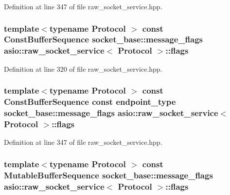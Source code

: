 Definition at line 347 of file raw\+\_\+socket\+\_\+service.\+hpp.

\hypertarget{classasio_1_1raw__socket__service_a735387eb54985dafc0ba5314df84590a}{}
\subsubsection[{flags}]{\setlength{\rightskip}{0pt plus 5cm}template$<$typename Protocol $>$ const Const\+Buffer\+Sequence {\bf socket\+\_\+base\+::message\+\_\+flags} {\bf asio\+::raw\+\_\+socket\+\_\+service}$<$ Protocol $>$\+::flags}\label{classasio_1_1raw__socket__service_a735387eb54985dafc0ba5314df84590a}


Definition at line 320 of file raw\+\_\+socket\+\_\+service.\+hpp.

\hypertarget{classasio_1_1raw__socket__service_a168e511287872068dd5009a20d36b8cd}{}
\subsubsection[{flags}]{\setlength{\rightskip}{0pt plus 5cm}template$<$typename Protocol $>$ const Const\+Buffer\+Sequence const {\bf endpoint\+\_\+type} {\bf socket\+\_\+base\+::message\+\_\+flags} {\bf asio\+::raw\+\_\+socket\+\_\+service}$<$ Protocol $>$\+::flags}\label{classasio_1_1raw__socket__service_a168e511287872068dd5009a20d36b8cd}


Definition at line 347 of file raw\+\_\+socket\+\_\+service.\+hpp.

\hypertarget{classasio_1_1raw__socket__service_a4cf894534b8f3ead1207ed06b557bc40}{}
\subsubsection[{flags}]{\setlength{\rightskip}{0pt plus 5cm}template$<$typename Protocol $>$ const Mutable\+Buffer\+Sequence {\bf socket\+\_\+base\+::message\+\_\+flags} {\bf asio\+::raw\+\_\+socket\+\_\+service}$<$ Protocol $>$\+::flags}\label{classasio_1_1raw__socket__service_a4cf894534b8f3ead1207ed06b557bc40}



